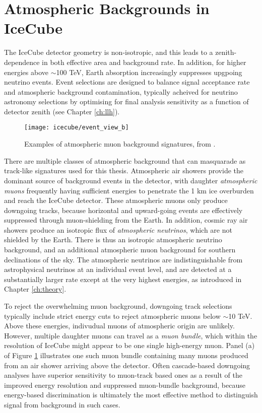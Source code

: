 \section{Atmospheric Backgrounds in IceCube}

The IceCube detector geometry is non-isotropic, and this leads to a zenith-dependence in both effective area and background rate. In addition, for higher energies above $\sim$100 TeV, Earth absorption increasingly suppresses upgpoing neutrino events. Event selections are designed to balance signal acceptance rate and atmospheric background contamination, typically acheived for neutrino astronomy selections by optimising for final analysis sensitivity as a function of detector zenith (see Chapter \ref{ch:llh}). 

\begin{figure}
	\centering \texttt{[image: icecube/event\_view\_b]}
	\caption{Examples of atmospheric muon background signatures, from \cite{kintscher_thesis}.}
	\label{fig:event_views_bkg}
\end{figure}

There are multiple classes of atmospheric background that can masquarade as track-like signatures used for this thesis. Atmospheric air showers provide the dominant source of background events in the detector, with daughter \emph{atmospheric muons} frequently having sufficient energies to penetrate the 1 km ice overburden and reach the IceCube detector. These atmospheric muons only produce downgoing tracks, because horizontal and upward-going events are effectively suppressed through muon-shielding from the Earth. In addition, cosmic ray air showers produce an isotropic flux of \emph{atmospheric neutrinos}, which are not shielded by the Earth. There is thus an isotropic atmospheric neutrino background, and an additional atmospheric muon background for southern declinations of the sky. The atmospheric neutrinos are indistinguishable from astrophysical neutrinos at an individual event level, and are detected at a substantially larger rate except at the very highest energies, as introduced in Chapter \ref{ch:theory}. 

To reject the overwhelming muon background, downgoing track selections typically include strict energy cuts to reject atmospheric muons below $\sim$10 TeV. Above these energies, indivudual muons of atmospheric origin are unlikely. However, multiple daughter muons can travel as a \emph{muon bundle}, which within the resolution of IceCube might appear to be one single high-energy muon. Panel (a) of Figure \ref{fig:event_views_bkg} illustrates one such muon bundle containing many muons produced from an air shower arriving above the detector. Often cascade-based downgoing analyses have superior sensitivity to muon-track based ones as a result of the improved energy resolution and suppressed muon-bundle background, because energy-based discrimination is ultimately the most effective method to distinguish signal from background in such cases.

